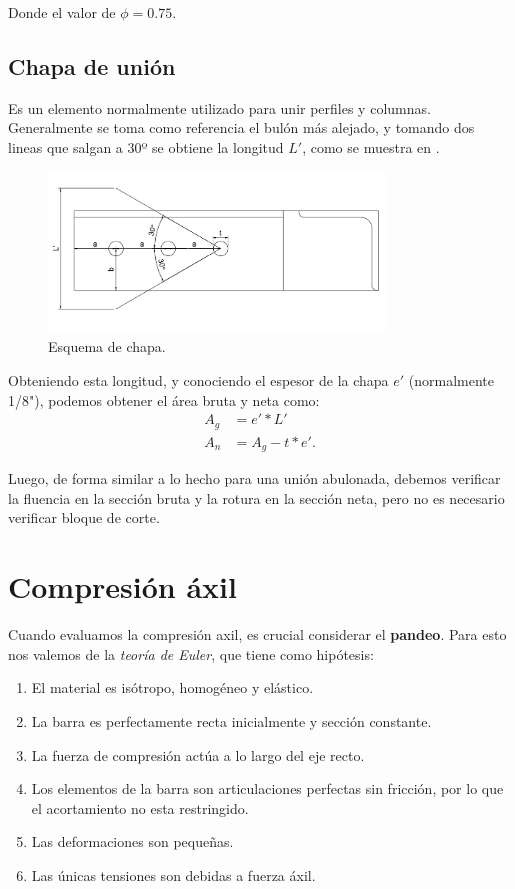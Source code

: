 \documentclass[../main.tex]{subfiles}
\begin{document}
Donde el valor de $\phi=0.75$.

\subsection{Chapa de unión}

Es un elemento normalmente utilizado para unir perfiles y columnas. Generalmente
se toma como referencia el bulón más alejado, y tomando dos lineas que salgan
a 30º se obtiene la longitud $L'$, como se muestra en .

\begin{figure}[htpb]
  \centering
  \includegraphics[width=0.8\textwidth]{../images/resumen/chapa}
  \caption{Esquema de chapa.}
  \label{fig:chapa}
\end{figure}

Obteniendo esta longitud, y conociendo el espesor de la chapa $e'$
(normalmente 1/8"), podemos obtener el área bruta y neta como:
\begin{align*}
  A_g &=  e' * L' \\[5pt]
  A_n &= A_g - t * e'
.\end{align*}

Luego, de forma similar a lo hecho para una unión abulonada, debemos verificar
la fluencia en la sección bruta y la rotura en la sección neta, pero no es
necesario verificar bloque de corte.

\section{Compresión áxil}

Cuando evaluamos la compresión axil, es crucial considerar el \textbf{pandeo}. 
Para esto nos valemos de la \textit{teoría de Euler}, que tiene como hipótesis:
\begin{enumerate}
  \item El material es isótropo, homogéneo y elástico.
  \item La barra es perfectamente recta inicialmente y sección constante.
  \item La fuerza de compresión actúa a lo largo del eje recto.
  \item Los elementos de la barra son articulaciones perfectas sin fricción, por
    lo que el acortamiento no esta restringido.
  \item Las deformaciones son pequeñas.
  \item Las únicas tensiones son debidas a fuerza áxil.
\end{enumerate}
\end{document}
